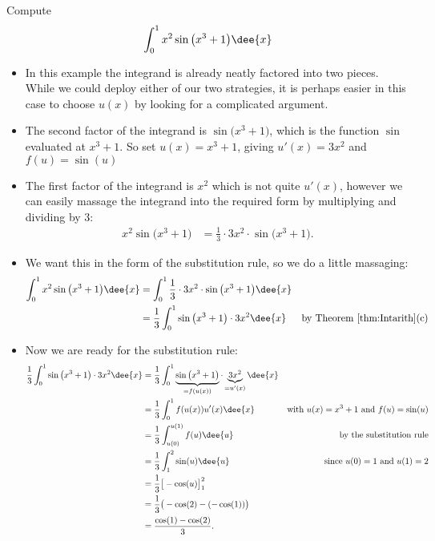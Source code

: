\begin{eg}\label{eg:substitution2}
Compute
\begin{align*}
  \int_0^1 x^2\sin\big(x^3+1\big)\dee{x}
\end{align*}
\soln
\begin{itemize}
 \item In this example the integrand is already neatly factored into two pieces. While we
could deploy either of our two strategies, it is perhaps easier in this case to
choose $u(x)$ by looking for a complicated argument.
\item The second factor of the integrand is $\sin\big(x^3+1\big)$, which is the function
$\sin$ evaluated at $x^3+1$. So set $u(x)=x^3+1$, giving $u'(x)=3x^2$ and $f(u)=\sin(u)$
\item The first factor of the integrand is $x^2$ which is not quite $u'(x)$, however we
can easily massage the integrand into the required form by multiplying and dividing by
$3$:
\begin{align*}
  x^2\sin\big(x^3+1\big) &= \frac{1}{3} \cdot 3x^2\cdot \sin\big(x^3+1\big).
\end{align*}
\item We want this in the form of the substitution rule, so we do a little massaging:
\begin{align*}
  \int_0^1 x^2\sin\big(x^3+1\big)\dee{x}
  &= \int_0^1 \frac{1}{3}\cdot 3x^2 \cdot \sin\big(x^3+1\big)\dee{x}\\
  &= \frac{1}{3}\int_0^1 \sin\big(x^3+1\big)\cdot 3x^2 \dee{x}
&\text{by Theorem~\ref{thm:Intarith}(c)}
\end{align*}
\item Now we are ready for the substitution rule:
\begin{align*}
\frac{1}{3}\int_0^1 \sin\big(x^3+1\big)\cdot 3x^2 \dee{x}
&=\frac{1}{3}\int_0^1 \underbrace{\sin\big(x^3+1\big)}_{=f(u(x))}\cdot
\underbrace{3x^2}_{=u'(x)} \dee{x}\\
&= \frac{1}{3}\int_0^1 f(u(x)) u'(x) \dee{x}
&\text{with $u(x)=x^3+1$ and $f(u)=\sin(u)$}\\
&= \frac{1}{3} \int_{u(0)}^{u(1)} f(u) \dee{u} & \text{by the substitution rule} \\
&= \frac{1}{3} \int_{1}^{2} \sin(u) \dee{u}  & \text{since $u(0)=1$ and
$u(1)=2$}\\
&= \frac{1}{3} \big[-\cos(u)\big]_1^2 \\
&= \frac{1}{3}\big( -\cos(2) -(-\cos(1)) \big)\\
&= \frac{\cos(1)-\cos(2)}{3}.
\end{align*}
\end{itemize}
\end{eg}

